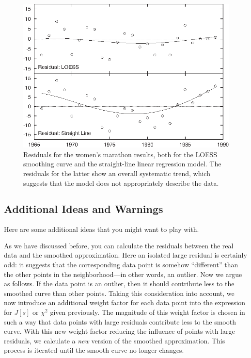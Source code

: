 \begin{figure}
  \centerline{\includegraphics{img/residuals}}
  \caption{Residuals for the women's marathon results, both for the
    LOESS smoothing curve and the straight-line linear regression
    model. The residuals for the latter show an overall systematic
    trend, which suggests that the model does not appropriately
    describe the data.}
  \label{fig:residuals}
\end{figure}

\subsection{Additional Ideas and Warnings}


Here are some additional ideas that you might want to play with.

As we have discussed before, you can calculate the residuals between
the real data and the smoothed approximation. Here an isolated large
residual is certainly odd: it suggests that the corresponding data
point is somehow ``different'' than the other points in the
neighborhood---in other words, an outlier. Now we argue as follows.
If the data point is an outlier, then it should contribute less to the
smoothed curve than other points. Taking this consideration into
account, we now introduce an additional weight factor for each data
point into the expression for $J[s]$ or $\chi^2$ given previously.
The magnitude of this weight factor is chosen in such a way that data
points with large residuals contribute less to the smooth curve.  With
this new weight factor reducing the influence of points with large
residuals, we calculate a \emph{new} version of the smoothed
approximation. This process is iterated until the smooth curve no
longer changes.

